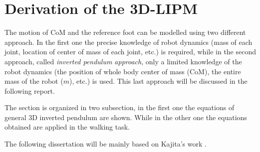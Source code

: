\section{Derivation of the 3D-LIPM}
The motion of CoM and the reference foot can be modelled using two different approach.
In the first one the precise knowledge of robot dynamics
(mass of each joint, location of center of mass of each joint, etc.) is required, while in
the second approach, called \emph{inverted pendulum approach}, only a limited knowledge of the
robot dynamics (the position of whole body center of mass
(CoM), the entire mass of the robot ($m$), etc.) is used.
This last approach will be discussed in the following report.
\par
The section is organized in two subsection, in the first one the equations of general 3D inverted
pendulum are shown. While in the other one the equations obtained are applied in the walking task.
\par
The following dissertation will be mainly based on Kajita's work \cite{Kajita2001}.
